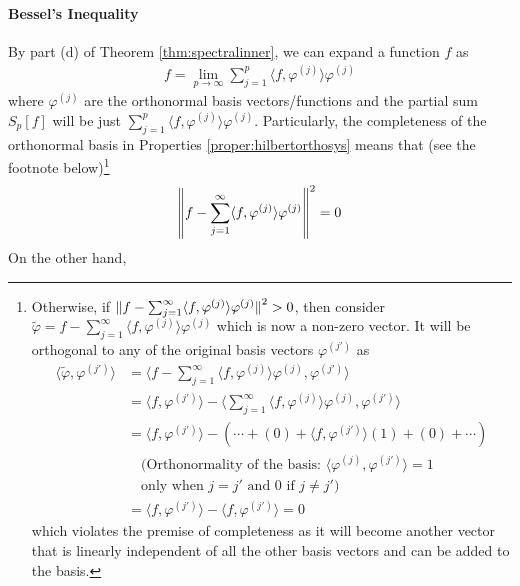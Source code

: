 \paragraph{Bessel's Inequality}
By part (d) of Theorem \ref{thm:spectralinner}, we can expand a function $f$ as
\begin{align}
f = \lim_{p \to \infty} \sum_{j=1}^{p} \langle f, \varphi^{(j)} \rangle \varphi^{(j)} 
\end{align}
where $\varphi^{(j)}$ are the orthonormal basis vectors/functions and the partial sum $S_p[f]$ will be just $\sum_{j=1}^{p} \langle f, \varphi^{(j)} \rangle \varphi^{(j)}$. Particularly, the completeness of the orthonormal basis in Properties \ref{proper:hilbertorthosys} means that (see the footnote below)\footnote{Otherwise, if $\norm{\smash{f - \sum_{j=1}^{\infty} \langle f, \varphi^{(j)} \rangle \varphi^{(j)}}}^2 > 0$, then consider $\tilde{\varphi} = f - \sum_{j=1}^{\infty} \langle f, \varphi^{(j)} \rangle \varphi^{(j)}$ which is now a non-zero vector. It will be orthogonal to any of the original basis vectors $\varphi^{(j')}$ as 
\begin{align*}
\langle \tilde{\varphi}, \varphi^{(j')} \rangle &= \langle f - \sum_{j=1}^{\infty} \langle f, \varphi^{(j)} \rangle \varphi^{(j)} , \varphi^{(j')} \rangle \\
&= \langle f, \varphi^{(j')} \rangle - \langle \sum_{j=1}^{\infty} \langle f, \varphi^{(j)} \rangle \varphi^{(j)} , \varphi^{(j')} \rangle \\
&= \langle f, \varphi^{(j')} \rangle - (\cdots + (0) +\langle f, \varphi^{(j')} \rangle (1) + (0) + \cdots) \\
& \quad \text{(Orthonormality of the basis: $\langle \varphi^{(j)}, \varphi^{(j')} \rangle = 1$ } \\ 
& \quad \text{only when $j = j'$ and $0$ if $j \neq j'$)} \\
&=\langle f, \varphi^{(j')} \rangle - \langle f, \varphi^{(j')} \rangle = 0
\end{align*}
which violates the premise of completeness as it will become another vector that is linearly independent of all the other basis vectors and can be added to the basis.}
\begin{align}
\norm{f - \sum_{j=1}^{\infty} \langle f, \varphi^{(j)} \rangle \varphi^{(j)}}^2 = 0 \label{eqn:fcomplete}
\end{align}
On the other hand,
